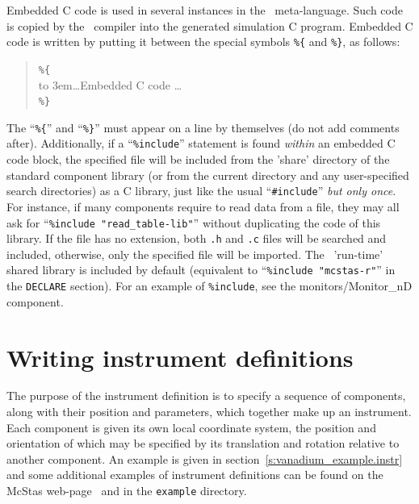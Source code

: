 Embedded C code is used in several instances in the \MCS\
meta-language. Such code is copied by the \MCS\ compiler into the
generated simulation C program. Embedded C code is written by putting it
between the special symbols \verb|%{| and \verb|%}|, as follows:
\begin{quote}
  \verb|%{| \\
  \hbox to 3em{}\ldots Embedded C code \ldots \\
  \verb|%}|
\end{quote} 
The ``\verb|%{|'' and ``\verb|%}|'' must appear on a line by themselves (do not add comments after).
Additionally, if a ``\verb+%include+'' statement is found \emph{within} an embedded C code block, the specified file will be included from the 'share' directory of the standard component library  (or from the
current directory and any user-specified search directories) as a C library, just like the usual ``\verb+#include+'' \emph{but only once}. For instance, if many components require to read data from a file, they may all ask for ``\verb+%include "read_table-lib"+''  without duplicating the code of this library. If the file has no extension, both \verb+.h+ and \verb+.c+ files will be searched and included, otherwise, only the specified file will be imported. The \MCS\ 'run-time' shared 
library is included by default (equivalent to ``\verb+%include "mcstas-r"+'' in the \texttt{DECLARE} section). \index{Library!Run-time}
For an
example of \texttt{\%include}, see the monitors/Monitor\_nD component.


\section{Writing instrument definitions}
\label{s:instrdefs}

The purpose of the instrument definition is to specify a sequence of
components, along with their position and parameters, which together
make up an instrument. Each component is given its own local coordinate
system, the position and orientation of which may be specified by its
translation and rotation relative to another component. An example is
given in section~\ref{s:vanadium_example.instr} and some additional
examples of instrument definitions can be found on the McStas
web-page~\cite{mcstas_webpage} and in the \texttt{example} directory.



